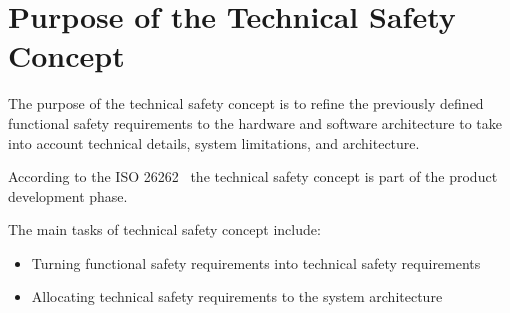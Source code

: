\chapter{Purpose of the Technical Safety Concept}
\label{ch:purpose}


The purpose of the technical safety concept is to refine the previously defined
functional safety requirements to the hardware and software architecture to
take into account technical details, system limitations, and architecture.

According to the ISO 26262~\cite{iso26262} the technical safety concept is part
of the product development phase.

The main tasks of technical safety concept include:
\begin{itemize}
  \item Turning functional safety requirements into technical safety requirements
  \item Allocating technical safety requirements to the system architecture
\end{itemize}
